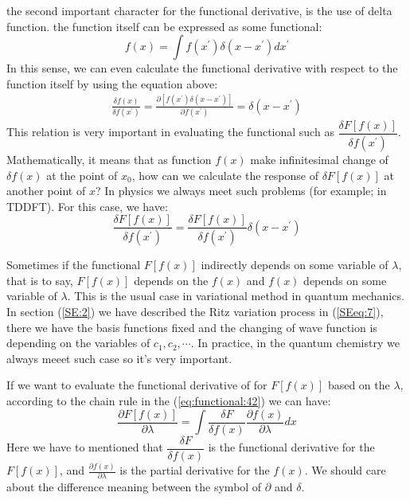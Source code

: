 the second important character for the functional derivative, is the
use of delta function. the function itself can be expressed as some
functional: 
\begin{equation}
  \label{eq:functional:43}
  f(x) = \int f(x^{'})\delta(x-x^{'})dx^{'}
\end{equation}
In this sense, we can even calculate the functional derivative with
respect to the function itself by using the equation above:
\begin{align}
  \label{eq:functional:44}
\frac{\delta f(x)}{\delta f(x^{'})} = \frac{\partial
  [f(x^{'})\delta(x-x^{'})]}{\partial f(x^{'})} = \delta(x-x^{'})  
\end{align}
This relation is very important in evaluating the functional such
as $\dfrac{\delta F[f(x)]}{\delta f(x^{'})}$. Mathematically, it
means that as function $f(x)$ make infinitesimal change of
$\delta f(x)$ at the point of $x_{0}$, how can we calculate the
response of $\delta F[f(x)]$ at another point of $x$? In physics we
always meet such problems (for example; in TDDFT). For this case, we
have:
\begin{equation}
  \label{eq:functional:45}
  \frac{\delta F[f(x)]}{\delta f(x^{'})} = \frac{\delta
    F[f(x)]}{\delta f(x^{'})} \delta(x-x^{'})
\end{equation}

Sometimes if the functional $F[f(x)]$ indirectly depends on some
variable of $\lambda$, that is to say, $F[f(x)]$ depends on the
$f(x)$ and $f(x)$ depends on some variable of $\lambda$. This is the
usual case in variational method in quantum mechanics. In section
(\ref{SE:2}) we have described the Ritz variation process in
(\ref{SEeq:7}), there we have the basis functions fixed and the
changing of wave function is depending on the variables of $c_{1},
c_{2}, \cdots$. In practice, in the quantum chemistry we always meeet
such case so it's very important.

If we want to evaluate the functional derivative of for $F[f(x)]$
based on the $\lambda$, according to the chain rule in the
(\ref{eq:functional:42}) we can have:
\begin{equation}
 \label{lambda_variable:1}
  \frac{\partial F[f(x)]}{\partial \lambda} = \int \frac{\delta
F}{\delta f(x)}\frac{\partial f(x)}{\partial\lambda}dx
\end{equation} 
Here we have to mentioned that $\dfrac{\delta F}{\delta f(x)}$ is the
functional derivative for the $F[f(x)]$, and $\frac{\partial
f(x)}{\partial\lambda}$ is the partial derivative for the $f(x)$. We
should care about the difference meaning between the symbol of
$\partial$ and $\delta$.



